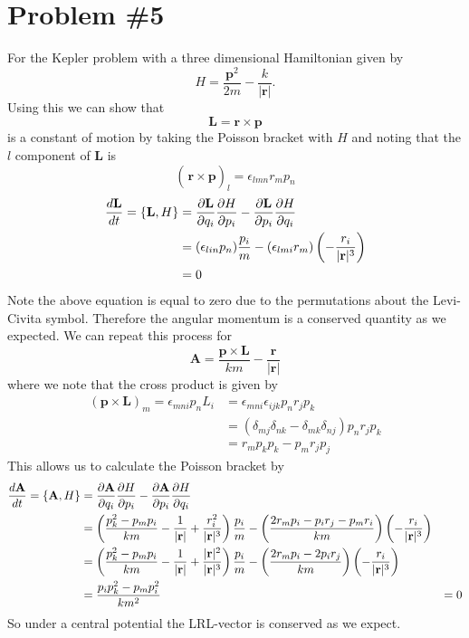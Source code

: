 \documentclass[11pt]{article}
\numberwithin{equation}{section}
\begin{document}
\pagebreak

\section{Problem \#5}
For the Kepler problem with a three dimensional Hamiltonian given by
$$H = \frac{\mathbf{p}^2}{2m} - \frac{k}{|\mathbf{r}|}.$$
Using this we can show that 
$$\mathbf{L} = \mathbf{r}\times\mathbf{p}$$
is a constant of motion by taking the Poisson bracket with $H$ and noting that the $l$ 
component of $\mathbf{L}$ is
$$\left(\frac{}{}\mathbf{r}\times\mathbf{p}\right)_{l} = \epsilon_{lmn}r_mp_n$$
\begin{align*}
\frac{d\mathbf{L}}{dt} = \{\mathbf{L},H\} &= \frac{\partial{\mathbf{L}}}{\partial{q_i}}\frac{\partial{H}}{\partial{p_i}} - \frac{\partial{\mathbf{L}}}{\partial{p_i}}\frac{\partial{H}}{\partial{q_i}}\\
&= (\epsilon_{lin}p_n)\frac{p_i}{m} - (\epsilon_{lmi}r_m)\left(-\frac{r_i}{|\mathbf{r}|^3}\right)\\
&= 0
\end{align*}
Note the above equation is equal to zero due to the permutations about the Levi-Civita 
symbol. Therefore the angular momentum is a conserved quantity as we expected. We can repeat
this process for 
$$\mathbf{A} = \frac{\mathbf{p}\times\mathbf{L}}{km} - \frac{\mathbf{r}}{|\mathbf{r}|}$$
where we note that the cross product is given by
\begin{align*}
(\mathbf{p}\times\mathbf{L})_m = \epsilon_{mni}p_nL_i &= \epsilon_{mni}\epsilon_{ijk}p_nr_jp_k \\
&= (\delta_{mj}\delta_{nk}-\delta_{mk}\delta_{nj})p_nr_jp_k\\
&= r_mp_kp_k - p_mr_jp_j
\end{align*}
This allows us to calculate the Poisson bracket by
\begin{align*}
\frac{d\mathbf{A}}{dt} = \{\mathbf{A},H\}  &= \frac{\partial{\mathbf{A}}}{\partial{q_i}}\frac{\partial{H}}{\partial{p_i}} - \frac{\partial{\mathbf{A}}}{\partial{p_i}}\frac{\partial{H}}{\partial{q_i}}\\
&= \left(\frac{p_k^2-p_mp_i}{km} - \frac{1}{|\mathbf{r}|} + \frac{r_i^2}{|\mathbf{r}|^3}\right)\frac{p_i}{m} - \left(\frac{2r_mp_i-p_ir_j-p_mr_i}{km}\right)\left(-\frac{r_i}{|\mathbf{r}|^3}\right)\\
&= \left(\frac{p_k^2-p_mp_i}{km} - \frac{1}{|\mathbf{r}|} + \frac{|\mathbf{r}|^2}{|\mathbf{r}|^3}\right)\frac{p_i}{m} - \left(\frac{2r_mp_i-2p_ir_j}{km}\right)\left(-\frac{r_i}{|\mathbf{r}|^3}\right)\\
&= \frac{p_ip_k^2-p_mp_i^2}{km^2} 
&= 0
\end{align*}
So under a central potential the LRL-vector is conserved as we expect.
\end{document}
